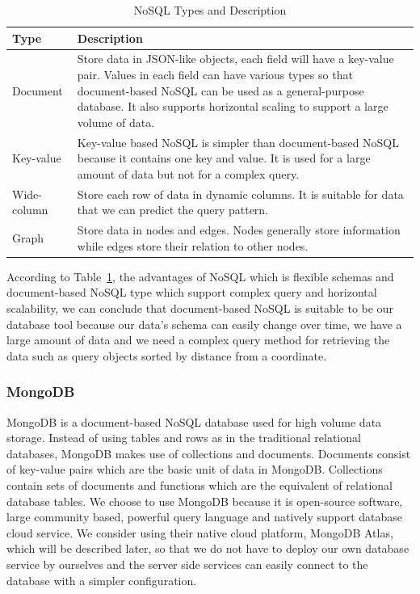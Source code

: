 \documentclass[12pt,oneside,openright,a4paper]{cpe-english-project}
\begin{document}
\begin{table}[!h]
\caption{NoSQL Types and Description}\label{tbl:2NoSQLTypesandDescription}
\begin{tabularx}{\textwidth}{l|X} \hline\hline
Type & Description \\ \hline\hline
Document & Store data in JSON-like objects, each field will have a key-value pair. Values in each field can have various types so that document-based NoSQL can be used as a general-purpose database. It also supports horizontal scaling to support a large volume of data. \\ \hline
Key-value & Key-value based NoSQL is simpler than document-based NoSQL because it contains one key and value. It is used for a large amount of data but not for a complex query. \\ \hline
Wide-column & Store each row of data in dynamic columns. It is suitable for data that we can predict the query pattern. \\ \hline
Graph & Store data in nodes and edges. Nodes generally store information while edges store their relation to other nodes. \\ \hline\hline
\end{tabularx}
\end{table}

According to Table~\ref{tbl:2NoSQLTypesandDescription}, the advantages of NoSQL which is flexible schemas and document-based NoSQL type which support complex query and horizontal scalability, we can conclude that document-based NoSQL is suitable to be our database tool because our data’s schema can easily change over time, we have a large amount of data and we need a complex query method for retrieving the data such as query objects sorted by distance from a coordinate.

\subsubsection{MongoDB}

MongoDB is a document-based NoSQL database used for high volume data storage. Instead of using tables and rows as in the traditional relational databases, MongoDB makes use of collections and documents. Documents consist of key-value pairs which are the basic unit of data in MongoDB. Collections contain sets of documents and functions which are the equivalent of relational database tables. \cite{WhatisMongoDBIntroductionArchitectureFeaturesExample} We choose to use MongoDB because it is open-source software, large community based, powerful query language and natively support database cloud service. We consider using their native cloud platform, MongoDB Atlas, which will be described later, so that we do not have to deploy our own database service by ourselves and the server side services can easily connect to the database with a simpler configuration.
\end{document}

